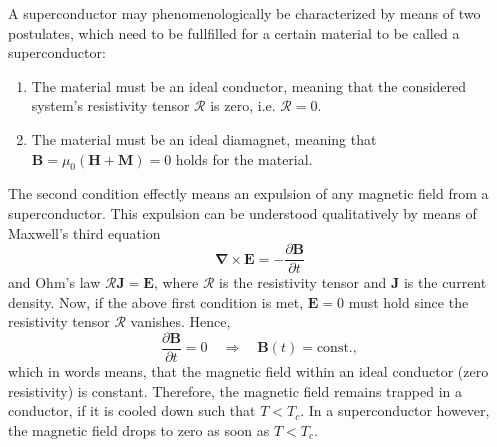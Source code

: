 \documentclass{report}
\numberwithin{tm}{section}
\newcommand\matr[1]{\ensuremath{\boldsymbol{\mathbf{#1}}}}
\newcommand\vect[1]{\ensuremath{\bm{#1}}}
\begin{document}
A superconductor may phenomenologically be characterized by means of two postulates, which need to be fullfilled for a certain material to be called a superconductor:
\begin{enumerate}
	\item The material must be an ideal conductor, meaning that the considered system's resistivity tensor $\matr{\mathcal{R}}$ is zero, i.e. $\matr{\mathcal{R}} = 0$.
	\item The material must be an ideal diamagnet, meaning that $\vect{B} = \mu_0(\vect{H}+\vect{M}) = 0$ holds for the material.
\end{enumerate}%

The second condition effectly means an expulsion of any magnetic field from a superconductor. This expulsion can be understood qualitatively by means of Maxwell's third equation \begin{equation}
	\vect{\nabla}\times \vect{E}  = -\frac{\partial \vect{B}}{\partial t}
\end{equation} and Ohm's law $\matr{\mathcal{R}}\vect{J} = \vect{E}$, where $\matr{\mathcal{R}}$ is the resistivity tensor and $\vect{J}$ is the current density. Now, if the above first condition is met, $\vect{E} = 0$ must hold since the resistivity tensor $\matr{\mathcal{R}}$ vanishes. Hence, \begin{equation}
	\frac{\partial \vect{B}}{\partial t} = 0 \quad \Rightarrow \quad \vect{B}(t) = \text{const.},
\end{equation} which in words means, that the magnetic field within an ideal conductor (zero resistivity) is constant. Therefore, the magnetic field remains trapped in a conductor, if it is cooled down such that $T < T_c$. In a superconductor however, the magnetic field drops to zero as soon as $T < T_c$.
\end{document}

